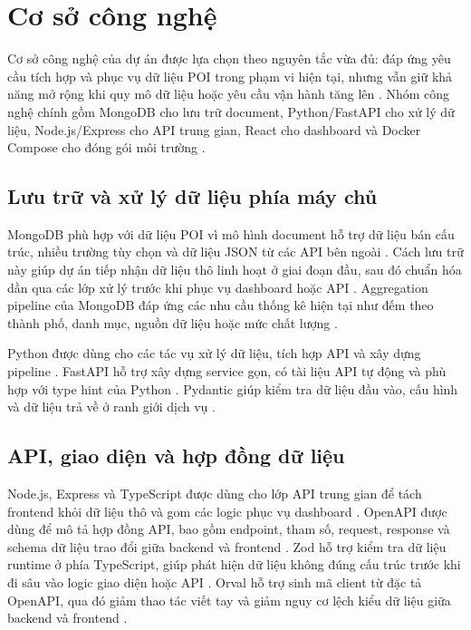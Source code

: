 \section{Cơ sở công nghệ}

Cơ sở công nghệ của dự án được lựa chọn theo nguyên tắc vừa đủ: đáp ứng yêu cầu tích hợp và phục vụ dữ liệu POI trong phạm vi hiện tại, nhưng vẫn giữ khả năng mở rộng khi quy mô dữ liệu hoặc yêu cầu vận hành tăng lên \cite{ibmWarehouseLake}. Nhóm công nghệ chính gồm MongoDB cho lưu trữ document, Python/FastAPI cho xử lý dữ liệu, Node.js/Express cho API trung gian, React cho dashboard và Docker Compose cho đóng gói môi trường \cite{dockerCompose}.\par

\subsection{Lưu trữ và xử lý dữ liệu phía máy chủ}

MongoDB phù hợp với dữ liệu POI vì mô hình document hỗ trợ dữ liệu bán cấu trúc, nhiều trường tùy chọn và dữ liệu JSON từ các API bên ngoài \cite{mongodbDataModel}. Cách lưu trữ này giúp dự án tiếp nhận dữ liệu thô linh hoạt ở giai đoạn đầu, sau đó chuẩn hóa dần qua các lớp xử lý trước khi phục vụ dashboard hoặc API \cite{mongodbDataModel}. Aggregation pipeline của MongoDB đáp ứng các nhu cầu thống kê hiện tại như đếm theo thành phố, danh mục, nguồn dữ liệu hoặc mức chất lượng \cite{mongodbAggregation}.\par

Python được dùng cho các tác vụ xử lý dữ liệu, tích hợp API và xây dựng pipeline \cite{pythonApps}. FastAPI hỗ trợ xây dựng service gọn, có tài liệu API tự động và phù hợp với type hint của Python \cite{fastapiFeatures}. Pydantic giúp kiểm tra dữ liệu đầu vào, cấu hình và dữ liệu trả về ở ranh giới dịch vụ \cite{pydanticModels}.\par

\subsection{API, giao diện và hợp đồng dữ liệu}

Node.js, Express và TypeScript được dùng cho lớp API trung gian để tách frontend khỏi dữ liệu thô và gom các logic phục vụ dashboard \cite{nodeAbout}. OpenAPI được dùng để mô tả hợp đồng API, bao gồm endpoint, tham số, request, response và schema dữ liệu trao đổi giữa backend và frontend \cite{openapiSpec}. Zod hỗ trợ kiểm tra dữ liệu runtime ở phía TypeScript, giúp phát hiện dữ liệu không đúng cấu trúc trước khi đi sâu vào logic giao diện hoặc API \cite{zodDocs}. Orval hỗ trợ sinh mã client từ đặc tả OpenAPI, qua đó giảm thao tác viết tay và giảm nguy cơ lệch kiểu dữ liệu giữa backend và frontend \cite{orvalDocs}.\par

